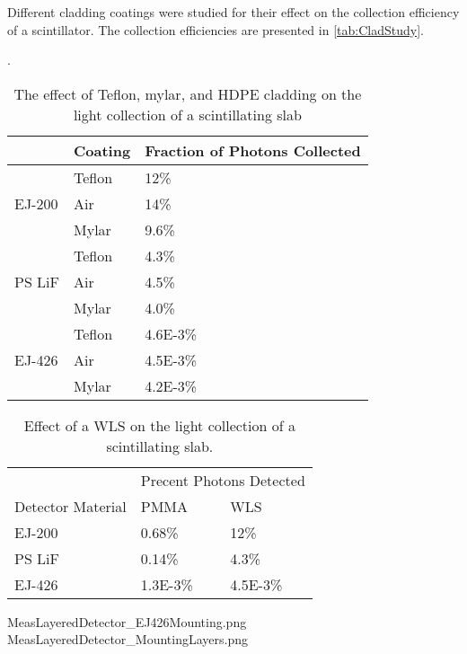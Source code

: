 Different cladding coatings were studied for their effect on the collection efficiency of a scintillator.
The collection efficiencies are presented in \autoref{tab:CladStudy}.
\begin{table}
  \caption[Teflon, Mylar, and HDPE Cladding Light Collection Effect]{The effect of Teflon, mylar, and HDPE cladding on the light collection of a scintillating slab}.
  \label{tab:CladStudy}
  \begin{tabular}{p{4cm} m{3cm} m{3cm}}
  \toprule
  & Coating & Fraction of Photons Collected \\
  \midrule 
  \multirow{3}{*}{EJ-200} & Teflon & 12\% \\
  				      & Air &  14\% \\
				      & Mylar & 9.6\% \\
  \midrule 
  \multirow{3}{*}{PS LiF} & Teflon & 4.3\% \\
  				      & Air & 4.5\% \\
				      & Mylar & 4.0\% \\
  \midrule 
  \multirow{3}{*}{EJ-426} & Teflon & \num{4.6E-3}\% \\
  				      & Air & \num{4.5E-3}\% \\
				      & Mylar & \num{4.2E-3}\% \\
 \bottomrule				 	   				  
  \end{tabular}
\end{table}
  \begin{table}
  \caption[Light Collection Increase with a WLS Bar]{Effect of a WLS on the light collection of a scintillating slab.}
  \label{tab:WLSStudy}
  \begin{tabular}{p{4cm} m{3cm} m{3cm}}
  \toprule
  & \multicolumn{2}{c}{Precent Photons Detected} \\
  Detector Material & PMMA &  WLS \\
  \midrule
 EJ-200 & 0.68\%  & 12\% \\
 PS LiF & 0.14\% & 4.3\% \\
 EJ-426 & \num{1.3E-3}\% & \num{4.5E-3}\% \\
 \bottomrule
  \end{tabular}
\end{table}


MeasLayeredDetector_EJ426Mounting.png
MeasLayeredDetector_MountingLayers.png
